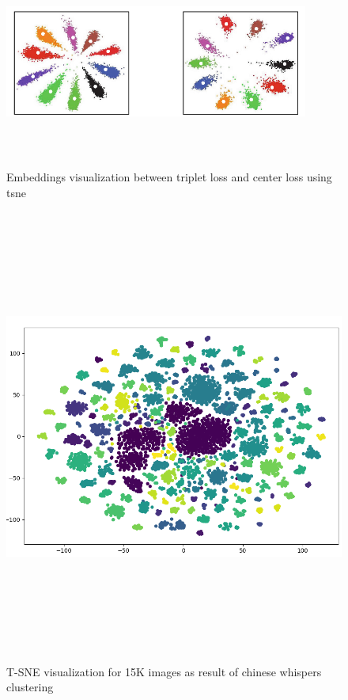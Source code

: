 \documentclass[a4paper,12pt, twoside]{NITKReport}
\begin{document}
\begin{figure} [h]
\centering
    \includegraphics[height=7cm,width=10cm]{embeddings.png}
    \caption{Embeddings visualization between triplet loss and center loss using tsne}
    \label{embedding_vis}
\end{figure}

\begin{figure} [h]
\centering
    \includegraphics[height=15cm,width=15cm]{tsne_15k.png}
    \caption{T-SNE visualization for 15K images as result of chinese whispers clustering}
    \label{tsne}
\end{figure}
\end{document}
